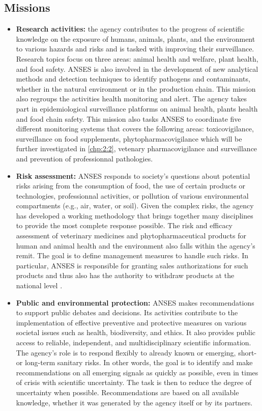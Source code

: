 \subsection{Missions} 

\begin{itemize}
\item \textbf{Research activities:} the agency contributes to the progress of scientific knowledge on the exposure of humans, animals, plants, and the environment to various hazards and risks and is tasked with improving their surveillance. Research topics focus on three areas: animal health and welfare, plant health, and food safety. ANSES is also involved in the development of new analytical methods and detection techniques to identify pathogens and contaminants, whether in the natural environment or in the production chain. This mission also regroups the activities health monitoring and alert. The agency takes part in epidemiological surveillance platforms on animal health, plants health and food chain safety. This mission also tasks ANSES to coordinate five different monitoring systems that covers the following areas: toxicovigilance, surveillance on food supplements, phytopharmacovigilance which will be further investigated in \ref{chp:2:2}, vetenary pharmacovigilance and surveillance and prevention of professionnal pathologies.      
\item \textbf{Risk assessment:} ANSES responds to society's questions about potential risks arising from the consumption of food, the use of certain products or technologies, professionnal activities, or pollution of various environmental compartments (e.g., air, water, or soil). Given the complex risks, the agency has developed a working methodology that brings together many disciplines to provide the most complete response possible. The risk and efficacy assessment of veterinary medicines and phytopharmaceutical products for human and animal health and the environment also falls within the agency's remit. The goal is to define management measures to handle such risks. In particular, ANSES is responsible for granting sales authorizations for such products and thus also has the authority to withdraw products at the national level \cite{ansesdec}. 
\item \textbf{Public and environmental protection:} ANSES makes recommendations to support public debates and decisions. Its activities contribute to the implementation of effective preventive and protective measures on various societal issues such as health, biodiversity, and ethics. It also provides public access to reliable, independent, and multidisciplinary scientific information. The agency's role is to respond flexibly to already known or emerging, short- or long-term sanitary risks. In other words, the goal is to identify and make recommendations on all emerging signals as quickly as possible, even in times of crisis with scientific uncertainty. The task is then to reduce the degree of uncertainty when possible. Recommendations are based on all available knowledge, whether it was generated by the agency itself or by its partners. 
\end{itemize}


